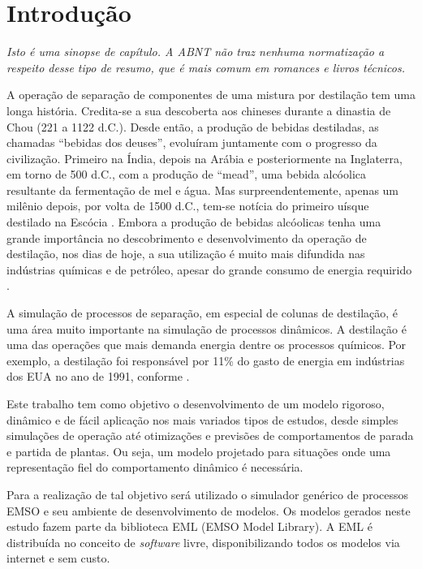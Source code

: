 %
% 
%
\chapter{Introdução} \label{chap:introduction}

\emph{Isto é uma sinopse de capítulo. A ABNT não traz nenhuma normatização a
respeito desse tipo de resumo, que é mais comum em romances e livros técnicos.
}


A operação de separação de componentes de uma mistura por destilação tem uma longa história. Credita-se a sua
descoberta aos chineses durante a dinastia de Chou (221 a 1122 d.C.). Desde então, a produção de bebidas destiladas,
as chamadas ``bebidas dos deuses'', evoluíram juntamente com o progresso da civilização. Primeiro na Índia, depois na
Arábia e posteriormente na Inglaterra, em torno de 500 d.C., com a produção de ``mead'', uma bebida alcóolica
resultante da fermentação de mel e água. Mas surpreendentemente, apenas um milênio depois, por volta de 1500 d.C.,
tem-se notícia do primeiro uísque destilado na Escócia . Embora a produção de bebidas
alcóolicas tenha uma grande importância no descobrimento e desenvolvimento da operação de destilação, nos dias de hoje,
a sua utilização é muito mais difundida nas indústrias químicas e de petróleo, apesar do grande consumo de energia
requirido \cite{Lockett:1986}.


A simulação de processos de separação, em especial de colunas de destilação, é uma área muito importante na simulação
de processos dinâmicos. A destilação é uma das operações que mais demanda
energia dentre os processos químicos. Por exemplo, a destilação foi
responsável por 11\% do gasto de energia em indústrias dos EUA no ano de 1991,
conforme .

Este trabalho tem como objetivo o desenvolvimento de um modelo rigoroso, dinâmico e de fácil aplicação nos mais
variados tipos de estudos, desde simples simulações de operação até otimizações e previsões de comportamentos
de parada e partida de plantas. Ou seja, um modelo projetado para situações onde uma representação fiel do
comportamento dinâmico é necessária.

Para a realização de tal objetivo será utilizado o simulador genérico de processos EMSO \cite{Soares:2003} e seu
ambiente de desenvolvimento de modelos. Os modelos gerados neste estudo fazem parte da biblioteca EML (EMSO Model
Library). A EML é distribuída no conceito de \emph{software} livre, disponibilizando todos os modelos via internet
e sem custo.

